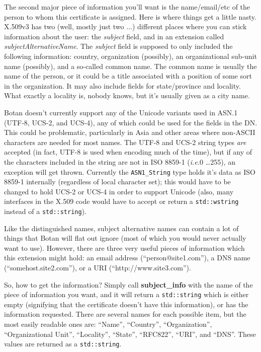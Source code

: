 \documentclass{article}
\newcommand{\function}[1]{\textbf{#1}}
\newcommand{\type}[1]{\texttt{#1}}
\newcommand{\ie}[0]{\emph{i.e.}}
\begin{document}
The second major piece of information you'll want is the name/email/etc of the
person to whom this certificate is assigned. Here is where things get a little
nasty. X.509v3 has two (well, mostly just two $\ldots$) different places where
you can stick information about the user: the \emph{subject} field, and in an
extension called \emph{subjectAlternativeName}. The \emph{subject} field is
supposed to only included the following information: country, organization
(possibly), an organizational sub-unit name (possibly), and a so-called common
name. The common name is usually the name of the person, or it could be a title
associated with a position of some sort in the organization. It may also
include fields for state/province and locality. What exactly a locality is,
nobody knows, but it's usually given as a city name.

Botan doesn't currently support any of the Unicode variants used in ASN.1
(UTF-8, UCS-2, and UCS-4), any of which could be used for the fields in the
DN. This could be problematic, particularly in Asia and other areas where
non-ASCII characters are needed for most names. The UTF-8 and UCS-2 string
types \emph{are} accepted (in fact, UTF-8 is used when encoding much of the
time), but if any of the characters included in the string are not in ISO
8859-1 (\ie 0 \ldots 255), an exception will get thrown. Currently the
\type{ASN1\_String} type holds it's data as ISO 8859-1 internally (regardless
of local character set); this would have to be changed to hold UCS-2 or UCS-4
in order to support Unicode (also, many interfaces in the X.509 code would have
to accept or return a \type{std::wstring} instead of a \type{std::string}).

Like the distinguished names, subject alternative names can contain a lot of
things that Botan will flat out ignore (most of which you would never actually
want to use). However, there are three very useful pieces of information which
this extension might hold: an email address (``person@site1.com''), a DNS name
(``somehost.site2.com''), or a URI (``http://www.site3.com'').

So, how to get the information? Simply call \function{subject\_info} with the
name of the piece of information you want, and it will return a
\type{std::string} which is either empty (signifying that the certificate
doesn't have this information), or has the information requested. There are
several names for each possible item, but the most easily readable ones are:
``Name'', ``Country'', ``Organization'', ``Organizational Unit'', ``Locality'',
``State'', ``RFC822'', ``URI'', and ``DNS''. These values are returned as a
\type{std::string}.
\end{document}
